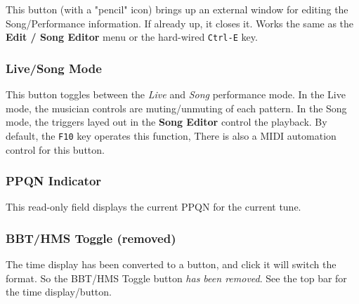    This button (with a "pencil" icon)
   brings up an external window for editing the Song/Performance
   information.  If already up, it closes it.
   Works the same as the
   \textbf{Edit / Song Editor} menu or the hard-wired \texttt{Ctrl-E} key.

\subsubsection{Live/Song Mode}
\label{subsubsec:introduction_livesong_mode_button}

   This button toggles between the \textsl{Live} and \textsl{Song} performance
   mode. In the Live mode, the musician controls are muting/unmuting of each
   pattern.  In the Song mode, the triggers layed out in the
   \textbf{Song Editor} control the playback.
   By default, the \texttt{F10} key operates this function,
   There is also a MIDI automation control for this button.

\begin{comment}
   \itempar{Toggle Tracks}{pattern!toggle tracks}
   \index{pattern!toggle tracks}
   This button changes the status of all of the
   \textsl{playing} tracks, reversing the
   mute status of each pattern that is playing.
   The next click will then unmute only those tracks.
   Because it can be confusing, this button is disabled
   in Song mode.

   The \texttt{Ctrl-M}, \texttt{Ctrl-U}, and \texttt{Ctrl-T} keys,
   as shown in the \textbf{Edit} menu, mute, unmute, and toggle
   all patterns.

\end{comment}

\subsubsection{PPQN Indicator}
\label{subsubsec:introduction_ppqn_indicator}

   This read-only field displays the current PPQN for the current tune.


\subsubsection{BBT/HMS Toggle (removed)}
\label{subsubsec:introduction_time_format_toggle_button}

   The time display has been converted to a button, and click it will
   switch the format. So the BBT/HMS Toggle button
   \textsl{has been removed}.
   See the top bar for the time display/button.


